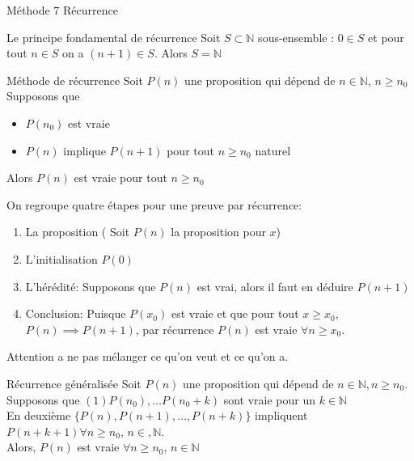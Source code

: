 

\begin{parag}{Méthode $7$ Récurrence}
    \begin{subparag}{Le principe fondamental de récurrence}
        Soit $S \subset \mathbb{N}$ sous-ensemble : $ 0 \in S$ et pour tout $n \in S$ on a $(n+1) \in S$. Alors $S = \mathbb{N}$
    \end{subparag}
    \begin{subparag}{Méthode de récurrence}
        Soit $P(n)$ une proposition qui dépend de $n \in \mathbb{N}$, $n \geq n_0$\\
Supposons que
        \begin{itemize}
            \item $P(n_0)$ est vraie
            \item $P(n)$ implique $P(n+1)$ pour tout $n \geq n_0$ naturel
        \end{itemize}
        Alors $P(n)$ est vraie pour tout $n \geq n_0$
    \end{subparag}
On regroupe quatre étapes pour une preuve par récurrence:
\begin{enumerate}
\item La proposition ( Soit $P(n)$ la proposition pour $x$)
\item L'initialisation $P(0)$
\item L'hérédité: Supposons que $P(n)$ est vrai, alors il faut en déduire $P(n+1)$
\item Conclusion: Puisque $P(x_0)$ est vraie et que pour tout $x \geq x_0$, $P(n) \implies P(n+1)$, par récurrence $P(n)$ est vraie $ \forall n \geq x_0$. 
    
\end{enumerate}
\begin{framedremark}
    Attention a ne pas mélanger ce qu'on veut et ce qu'on a.
\end{framedremark}

\end{parag}
\begin{parag}{Récurrence généralisée}
    Soit $P(n)$ une proposition qui dépend de $n \in \mathbb{N}, n \geq n_0$.\\
    Supposons que $(1) P(n_0), \dots P(n_0 + k)$ sont vraie pour un $k \in \mathbb{N}$\\
    En deuxième $\{ P(n), P(n+1), \dots, P(n+k)\}$ impliquent $P(n +k+1) \forall n \geq n_0$, $n \in , \mathbb{N}$.\\
    Alors, $P(n)$ est vraie $ \forall n \geq n_0$, $ n \in \mathbb{N}$
\end{parag}

